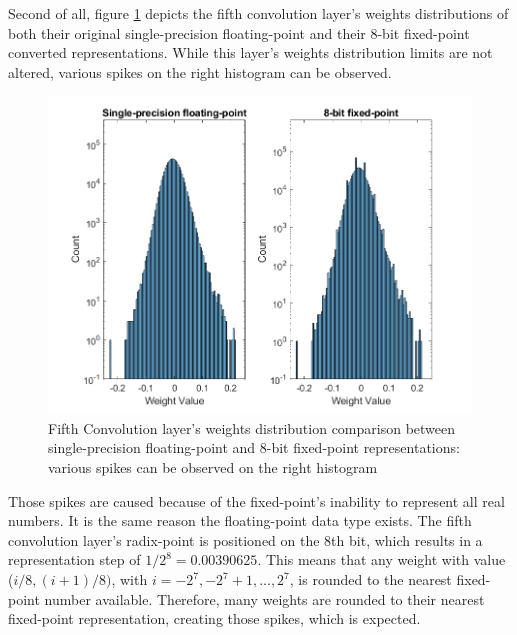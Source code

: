 Second of all, figure \ref{fig:weight-distribution-comparison-conv5} depicts the fifth convolution layer's weights distributions of both their original single-precision floating-point and their 8-bit fixed-point converted representations. While this layer's weights distribution limits are not altered, various spikes on the right histogram can be observed.

\begin{figure} [H]
	\centering
	\includegraphics[scale=0.9]{Images/Weights-distributions/original-vs-fixed8/weight-distribution-conv5.png}
	\decoRule
	\caption[Fifth Convolution layer's weights distribution comparison between single-precision floating-point and 8-bit fixed-point representations]{Fifth Convolution layer's weights distribution comparison between single-precision floating-point and 8-bit fixed-point representations: various spikes can be observed on the right histogram}
	\label{fig:weight-distribution-comparison-conv5}
\end{figure}

Those spikes are caused because of the fixed-point's inability to represent all real numbers. It is the same reason the floating-point data type exists. The fifth convolution layer's radix-point is positioned on the 8th bit, which results in a representation step of $1/2^8 = 0.00390625$. This means that any weight with value ($i/8, (i + 1)/8)$, with $i=-2^7, -2^7 + 1, ..., 2^7$, is rounded to the nearest fixed-point number available. Therefore, many weights are rounded to their nearest fixed-point representation, creating those spikes, which is expected.

